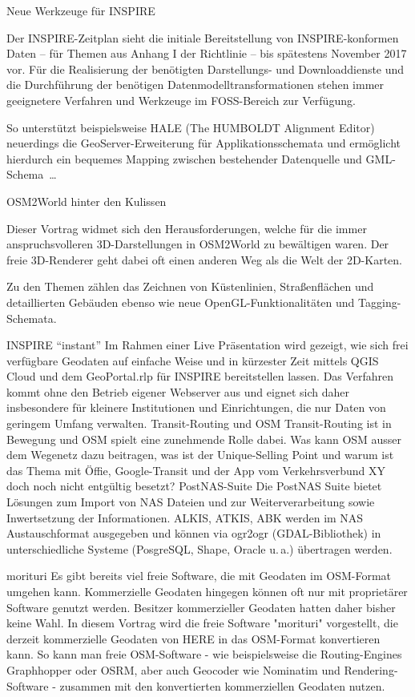 %
{Neue Werkzeuge für INSPIRE}%
{}%
{Der INSPIRE-Zeitplan sieht die initiale Bereitstellung von INSPIRE-konformen
Daten -- für Themen aus Anhang I der Richtlinie -- bis spätestens November 2017 vor.
Für die Realisierung der benötigten Darstellungs- und Download\-dienste und die Durchführung
der benötigen Datenmodelltransformationen stehen immer geeignetere Verfahren und Werkzeuge
im FOSS-Bereich zur Verfügung.

So unterstützt beispielsweise HALE (The HUMBOLDT Alignment Editor) neuerdings die GeoServer-Erweiterung
für Applikationsschemata und ermöglicht hierdurch ein bequemes Mapping zwischen
bestehender Datenquelle und GML-Schema~\dots}

\enlargethispage{2\baselineskip}
%
{OSM2World hinter den Kulissen}%
{}%
{Dieser Vortrag widmet sich den Herausforderungen, welche für die immer anspruchsvolleren 3D-Darstellungen in
OSM2World zu bewältigen waren. Der freie 3D-Renderer geht dabei oft einen anderen Weg als die Welt der 2D-Karten.

Zu den Themen zählen das Zeichnen von Küstenlinien, Straßenflächen und detaillierten Gebäuden ebenso wie neue
OpenGL-Funktionalitäten und Tagging-Schemata.}
%
%
{INSPIRE "`instant"'}%
{}%
{Im Rahmen einer Live Präsentation wird gezeigt, wie sich frei verfügbare Geodaten auf einfache Weise und
in kürzester Zeit mittels QGIS Cloud und dem GeoPortal.rlp für INSPIRE bereitstellen lassen.
Das Verfahren kommt ohne den Betrieb eigener Webserver aus und eignet sich daher insbesondere
für kleinere Institutionen und Einrichtungen, die nur Daten von geringem Umfang verwalten.}
%
%
{Transit-Routing und OSM}%
{}%
{Transit-Routing ist in Bewegung und OSM spielt eine zunehmende Rolle dabei. Was kann OSM ausser dem Wegenetz dazu beitragen, was ist der Unique-Selling Point und warum ist das Thema mit Öffie, Google-Transit und der App vom Verkehrsverbund XY doch noch nicht entgültig besetzt?}
%
%
{PostNAS-Suite}%
{}%
{Die PostNAS Suite bietet Lösungen zum Import von NAS Dateien und zur Weiterverarbeitung
sowie Inwertsetzung der Informationen. ALKIS, ATKIS, ABK werden im NAS Austauschformat
ausgegeben und können via ogr2ogr (GDAL-Bibliothek) in unterschiedliche Systeme
(PosgreSQL, Shape, Oracle u.\,a.) übertragen werden.
}

%
{morituri}%
{}%
{Es gibt bereits viel freie Software, die mit Geodaten im OSM-Format umgehen kann.
Kommerzielle Geodaten hingegen können oft nur mit proprietärer Software genutzt werden.
Besitzer kommerzieller Geodaten hatten daher bisher keine Wahl.
In diesem Vortrag wird die freie Software "morituri" vorgestellt, die derzeit kommerzielle Geodaten von HERE in das OSM-Format konvertieren kann.
So kann man freie OSM-Software - wie beispielsweise die Routing-Engines Graphhopper oder OSRM, aber auch Geocoder wie Nominatim und Rendering-Software - zusammen mit den konvertierten kommerziellen Geodaten nutzen.}


